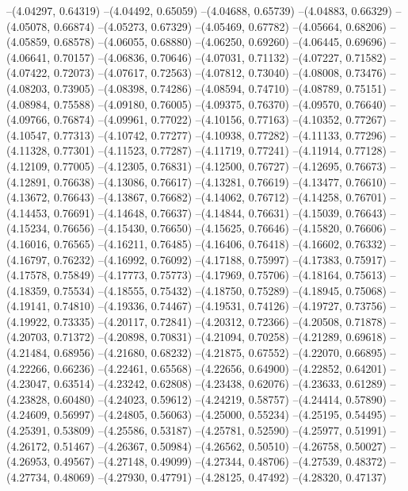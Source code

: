 --(4.04297, 0.64319)
--(4.04492, 0.65059)
--(4.04688, 0.65739)
--(4.04883, 0.66329)
--(4.05078, 0.66874)
--(4.05273, 0.67329)
--(4.05469, 0.67782)
--(4.05664, 0.68206)
--(4.05859, 0.68578)
--(4.06055, 0.68880)
--(4.06250, 0.69260)
--(4.06445, 0.69696)
--(4.06641, 0.70157)
--(4.06836, 0.70646)
--(4.07031, 0.71132)
--(4.07227, 0.71582)
--(4.07422, 0.72073)
--(4.07617, 0.72563)
--(4.07812, 0.73040)
--(4.08008, 0.73476)
--(4.08203, 0.73905)
--(4.08398, 0.74286)
--(4.08594, 0.74710)
--(4.08789, 0.75151)
--(4.08984, 0.75588)
--(4.09180, 0.76005)
--(4.09375, 0.76370)
--(4.09570, 0.76640)
--(4.09766, 0.76874)
--(4.09961, 0.77022)
--(4.10156, 0.77163)
--(4.10352, 0.77267)
--(4.10547, 0.77313)
--(4.10742, 0.77277)
--(4.10938, 0.77282)
--(4.11133, 0.77296)
--(4.11328, 0.77301)
--(4.11523, 0.77287)
--(4.11719, 0.77241)
--(4.11914, 0.77128)
--(4.12109, 0.77005)
--(4.12305, 0.76831)
--(4.12500, 0.76727)
--(4.12695, 0.76673)
--(4.12891, 0.76638)
--(4.13086, 0.76617)
--(4.13281, 0.76619)
--(4.13477, 0.76610)
--(4.13672, 0.76643)
--(4.13867, 0.76682)
--(4.14062, 0.76712)
--(4.14258, 0.76701)
--(4.14453, 0.76691)
--(4.14648, 0.76637)
--(4.14844, 0.76631)
--(4.15039, 0.76643)
--(4.15234, 0.76656)
--(4.15430, 0.76650)
--(4.15625, 0.76646)
--(4.15820, 0.76606)
--(4.16016, 0.76565)
--(4.16211, 0.76485)
--(4.16406, 0.76418)
--(4.16602, 0.76332)
--(4.16797, 0.76232)
--(4.16992, 0.76092)
--(4.17188, 0.75997)
--(4.17383, 0.75917)
--(4.17578, 0.75849)
--(4.17773, 0.75773)
--(4.17969, 0.75706)
--(4.18164, 0.75613)
--(4.18359, 0.75534)
--(4.18555, 0.75432)
--(4.18750, 0.75289)
--(4.18945, 0.75068)
--(4.19141, 0.74810)
--(4.19336, 0.74467)
--(4.19531, 0.74126)
--(4.19727, 0.73756)
--(4.19922, 0.73335)
--(4.20117, 0.72841)
--(4.20312, 0.72366)
--(4.20508, 0.71878)
--(4.20703, 0.71372)
--(4.20898, 0.70831)
--(4.21094, 0.70258)
--(4.21289, 0.69618)
--(4.21484, 0.68956)
--(4.21680, 0.68232)
--(4.21875, 0.67552)
--(4.22070, 0.66895)
--(4.22266, 0.66236)
--(4.22461, 0.65568)
--(4.22656, 0.64900)
--(4.22852, 0.64201)
--(4.23047, 0.63514)
--(4.23242, 0.62808)
--(4.23438, 0.62076)
--(4.23633, 0.61289)
--(4.23828, 0.60480)
--(4.24023, 0.59612)
--(4.24219, 0.58757)
--(4.24414, 0.57890)
--(4.24609, 0.56997)
--(4.24805, 0.56063)
--(4.25000, 0.55234)
--(4.25195, 0.54495)
--(4.25391, 0.53809)
--(4.25586, 0.53187)
--(4.25781, 0.52590)
--(4.25977, 0.51991)
--(4.26172, 0.51467)
--(4.26367, 0.50984)
--(4.26562, 0.50510)
--(4.26758, 0.50027)
--(4.26953, 0.49567)
--(4.27148, 0.49099)
--(4.27344, 0.48706)
--(4.27539, 0.48372)
--(4.27734, 0.48069)
--(4.27930, 0.47791)
--(4.28125, 0.47492)
--(4.28320, 0.47137)
